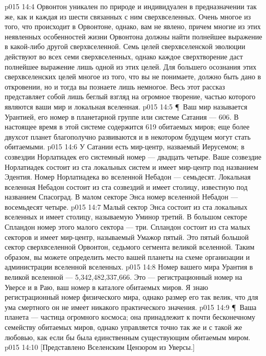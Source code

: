 \vs p015 14:4 Орвонтон уникален по природе и индивидуален в предназначении так же, как и каждая из шести связанных с ним сверхвселенных. Очень многое из того, что происходит в Орвонтоне, однако, вам не явлено, причем многие из этих неявленных особенностей жизни Орвонтона должны найти полнейшее выражение в какой\hyp{}либо другой сверхвселенной. Семь целей сверхвселенской эволюции действуют во всех семи сверхвселенных, однако каждое сверхтворение даст полнейшее выражение лишь одной из этих целей. Для большего осознания этих сверхвселенских целей многое из того, что вы не понимаете, должно быть дано в откровении, но и тогда вы познаете лишь немногое. Весь этот рассказ представляет собой лишь беглый взгляд на огромное творение, частью которого являются ваши мир и локальная вселенная.
\vs p015 14:5 \P\ Ваш мир называется Урантией, его номер в планетарной группе или системе Сатания --- 606. В настоящее время в этой системе содержится 619 обитаемых миров; еще более двухсот планет благополучно развиваются и в некотором будущем могут стать обитаемыми.
\vs p015 14:6 У Сатании есть мир\hyp{}центр, назваемый Иерусемом; в созвездии Норлатиадек его системный номер --- двадцать четыре. Ваше созвездие Норлатиадек состоит из ста локальных систем и имеет мир\hyp{}центр под названием Эдентия. Номер Норлатиадека во вселенной Небадон --- семьдесят. Локальная вселенная Небадон состоит из ста созвездий и имеет столицу, известную под названием Спасоград. В малом секторе Энса номер вселенной Небадон --- восемьдесят четыре.
\vs p015 14:7 Малый сектор Энса состоит из ста локальных вселенных и имеет столицу, называемую Уминор третий. В большом секторе Спландон номер этого малого сектора --- три. Спландон состоит из ста малых секторов и имеет мир\hyp{}центр, называемый Умажор пятый. Это пятый большой сектор сверхвселенной Орвонтон, седьмого сегмента великой вселенной. Таким образом, вы можете определить место вашей планеты на схеме организации и администрации вселенной вселенных.
\vs p015 14:8 Номер вашего мира Урантия в великой вселенной --- 5,342,482,337,666. Это --- регистрационный номер на Уверсе и в Раю, ваш номер в каталоге обитаемых миров. Я знаю регистрационный номер физического мира, однако размер его так велик, что для ума смертного он не имеет никакого практического значения.
\vs p015 14:9 \P\ Ваша планета --- частица огромного космоса; она принадлежит к почти бесконечному семейству обитаемых миров, однако управляется точно так же и с такой же любовью, как если бы была единственным существующим обитаемым миром.
\vs p015 14:10 [Представлено Вселенским Цензором из Уверсы.]
